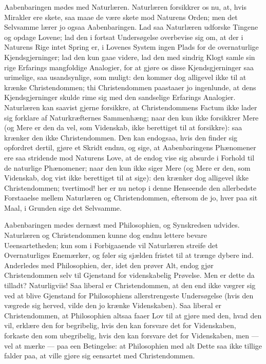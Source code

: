 \documentclass[12pt,a4paper]{book}
\newcommand{\opage}[1]{\marginnote{\footnotesize\textit{[#1]}}}
\begin{document}
Aabenbaringen mødes med Naturlæren. Naturlæren forsikkrer os nu, at,
hvis Mirakler ere skete, saa maae de være skete mod Naturens Orden; men
det Selvsamme lærer jo ogsaa Aabenbaringen. Lad saa Naturlæren udforske
Tingene og opdage Lovene; lad den i fortsat Undersøgelse overbevise sig
om, at der i
\opage{5} Naturens Rige intet Spring er, i Lovenes System ingen Plads for de
overnaturlige Kjendsgjerninger; lad den kun gaae videre, lad den med
sindrig Klogt samle sin rige Erfarings mangfoldige Analogier, for at
gjøre os disse Kjendsgjerninger saa urimelige, saa usandsynlige, som
muligt: den kommer dog alligevel ikke til at krænke Christendommen; thi
Christendommen paastaaer jo ingenlunde, at dens Kjendsgjerninger skulde
rime sig med den sandselige Erfarings Analogier. Naturlæren kan saavist
gjerne forsikkre, at Christendommens Factum ikke lader sig forklare af
Naturkræfternes Sammenhæng; naar den kun ikke forsikkrer Mere (og Mere er
den da vel, som Videnskab, ikke berettiget til at forsikkre): saa krænker
den ikke Christendommen. Den kan endogsaa, hvis den finder sig opfordret
dertil, gjøre et Skridt endnu, og sige, at Aabenbaringens Phænomener ere
saa stridende mod Naturens Love, at de endog vise sig absurde i Forhold
til de naturlige Phænomener; naar den kun ikke siger Mere (og Mere er
den, som Videnskab, dog vist ikke berettiget til at sige): den krænker
dog alligevel ikke Christendommen; tvertimod! her er nu netop i denne
Henseende den allerbedste Forstaaelse mellem Naturlæren og
Christendommen, eftersom de jo, hver paa sit Maal, i Grunden sige det
Selvsamme.

Aabenbaringen mødes dernæst med Philosophien, og Synskredsen udvides.
Naturlæren og Christendommen kunne dog endnu lettere bevare
Ueensartetheden; kun som i Forbigaaende vil Naturlæren streife det
Overnaturliges Enemærker, og føler sig sjælden fristet til at trænge
dybere ind. Anderledes med Philosophien, der, idet den prøver Alt, endog
gjør Christendommen selv til Gjenstand for videnskabelig Prøvelse. Men er
dette da tilladt? Naturligviis! Saa liberal er Christendommen, at den end
ikke vægrer sig ved at blive Gjenstand for Philosophiens allerstrengeste
Undersøgelse (hvis den vægrede sig herved, vilde den jo krænke
Videnskaben). Saa liberal er Christendommen, at Philosophien
\opage{6} altsaa faaer Lov til at gjøre med den, hvad den vil, erklære den for
begribelig, hvis den kan forsvare det for Videnskaben, forkaste den som
ubegribelig, hvis den kan forsvare det for Videnskaben, men --- vel at
mærke --- paa een Betingelse: at Philosophien med alt Dette saa ikke
tillige falder paa, at ville gjøre sig eensartet med Christendommen.
\end{document}
